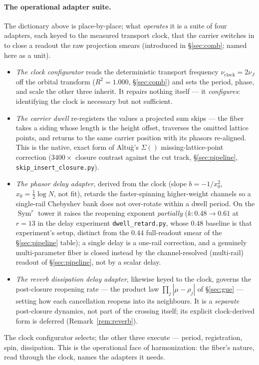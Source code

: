 \documentclass[11pt]{article}
\theoremstyle{definition}
\newcommand{\Sym}{\operatorname{Sym}}
\begin{document}
\paragraph{The operational adapter suite.} The dictionary above is place-by-place; what \emph{operates} it is a
suite of four adapters, each keyed to the measured transport clock, that the carrier switches in to close a
readout the raw projection smears (introduced in \S\ref{sec:comb}; named here as a unit).
\begin{itemize}
\item[\textup{(1)}] \emph{The clock configurator} reads the deterministic transport frequency
$\nu_{\mathrm{clock}}=2\nu_J$ off the orbital transform ($R^2=1.000$, \S\ref{sec:comb}) and sets the period,
phase, and scale the other three inherit. It repairs nothing itself --- it \emph{configures}: identifying the
clock is necessary but not sufficient.
\item[\textup{(2)}] \emph{The carrier dwell} re-registers the values a projected sum skips --- the fiber takes a
siding whose length is the height offset, traverses the omitted lattice points, and returns to the same carrier
position with its phasors re-aligned. This is the native, exact form of Altu\u{g}'s $\Sigma()$
missing-lattice-point correction ($3400\times$ closure contrast against the cut track, \S\ref{sec:pipeline},
\texttt{skip\_insert\_closure.py}).
\item[\textup{(3)}] \emph{The phasor delay adapter}, derived from the clock (slope $b=-1/x_0^2$, $x_0=\tfrac12
\log N$, not fit), retards the faster-spinning higher-weight channels so a single-rail Chebyshev bank does not
over-rotate within a dwell period. On the $\Sym^r$ tower it raises the reopening exponent \emph{partially}
($k\colon0.48\to0.61$ at $r=13$ in the delay experiment \texttt{dwell\_retard.py}, whose $0.48$ baseline is that
experiment's setup, distinct from the $0.44$ full-readout smear of the \S\ref{sec:pipeline} table); a single
delay is a one-rail correction, and a
genuinely multi-parameter fiber is closed instead by the channel-resolved (multi-rail) readout of
\S\ref{sec:pipeline}, not by a scalar delay.
\item[\textup{(4)}] \emph{The reverb dissipation delay adapter}, likewise keyed to the clock, governs the
post-closure reopening rate --- the product law $\prod_j|\mu-\rho_j|$ of \S\ref{sec:gue} --- setting how each
cancellation reopens into its neighbours. It is a \emph{separate} post-closure dynamics, not part of the crossing
itself; its explicit clock-derived form is deferred (Remark~\ref{rem:reverb}).
\end{itemize}
The clock configurator selects; the other three execute --- period, registration, spin, dissipation. This is the
operational face of harmonization: the fiber's nature, read through the clock, names the adapters it needs.
\end{document}
